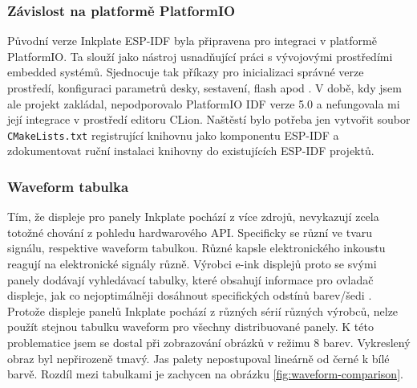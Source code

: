 \subsubsection{Závislost na platformě PlatformIO} Původní verze Inkplate ESP-IDF byla připravena pro integraci v platformě PlatformIO. Ta slouží jako nástroj usnadňující práci s vývojovými prostředími embedded systémů. Sjednocuje tak příkazy pro inicializaci správné verze prostředí, konfiguraci parametrů desky, sestavení, flash apod \cite{WhatPlatformIOPlatformIO}. V době, kdy jsem ale projekt zakládal, nepodporovalo PlatformIO IDF verze 5.0 a nefungovala mi její integrace v prostředí editoru CLion. Naštěstí bylo potřeba jen vytvořit soubor \lstinline|CMakeLists.txt| registrující knihovnu jako komponentu ESP-IDF a zdokumentovat ruční instalaci knihovny do existujících ESP-IDF projektů.

\subsubsection{Waveform tabulka} Tím, že displeje pro panely Inkplate pochází z více zdrojů, nevykazují zcela totožné chování z pohledu hardwarového API. Specificky se různí ve tvaru signálu, respektive waveform tabulkou. Různé kapsle elektronického inkoustu reagují na elektronické signály různě. Výrobci e-ink displejů proto se svými panely dodávají vyhledávací tabulky, které obsahují informace pro ovladač displeje, jak co nejoptimálněji dosáhnout specifických odstínů barev/šedi \cite{WaveformsTableIntroduction}. Protože displeje panelů Inkplate pochází z různých sérií různých výrobců, nelze použít stejnou tabulku waveform pro všechny distribuované panely. K této problematice jsem se dostal při zobrazování obrázků v režimu 8 barev. Vykreslený obraz byl nepřirozeně tmavý. Jas palety nepostupoval lineárně od černé k bílé barvě. Rozdíl mezi tabulkami je zachycen na obrázku \ref{fig:waveform-comparison}.

